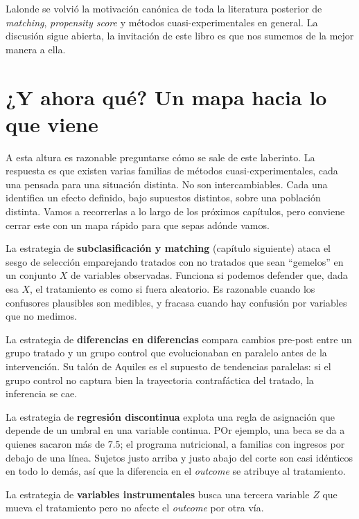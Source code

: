 \documentclass[
  letterpaper,
  DIV=11,
  numbers=noendperiod,
  oneside]{scrreprt}
\begin{document}
Lalonde se volvió la motivación canónica de toda la literatura posterior
de \emph{matching}, \emph{propensity score} y métodos
cuasi-experimentales en general. La discusión sigue abierta, la
invitación de este libro es que nos sumemos de la mejor manera a ella.

\hypertarget{y-ahora-quuxe9-un-mapa-hacia-lo-que-viene}{%
\section{¿Y ahora qué? Un mapa hacia lo que
viene}\label{y-ahora-quuxe9-un-mapa-hacia-lo-que-viene}}

A esta altura es razonable preguntarse cómo se sale de este laberinto.
La respuesta es que existen varias familias de métodos
cuasi-experimentales, cada una pensada para una situación distinta. No
son intercambiables. Cada una identifica un efecto definido, bajo
supuestos distintos, sobre una población distinta. Vamos a recorrerlas a
lo largo de los próximos capítulos, pero conviene cerrar este con un
mapa rápido para que sepas adónde vamos.

La estrategia de \textbf{subclasificación y matching} (capítulo
siguiente) ataca el sesgo de selección emparejando tratados con no
tratados que sean ``gemelos'' en un conjunto \(X\) de variables
observadas. Funciona si podemos defender que, dada esa \(X\), el
tratamiento es como si fuera aleatorio. Es razonable cuando los
confusores plausibles son medibles, y fracasa cuando hay confusión por
variables que no medimos.

La estrategia de \textbf{diferencias en diferencias} compara cambios
pre-post entre un grupo tratado y un grupo control que evolucionaban en
paralelo antes de la intervención. Su talón de Aquiles es el supuesto de
tendencias paralelas: si el grupo control no captura bien la trayectoria
contrafáctica del tratado, la inferencia se cae.

La estrategia de \textbf{regresión discontinua} explota una regla de
asignación que depende de un umbral en una variable continua. POr
ejemplo, una beca se da a quienes sacaron más de 7.5; el programa
nutricional, a familias con ingresos por debajo de una línea. Sujetos
justo arriba y justo abajo del corte son casi idénticos en todo lo
demás, así que la diferencia en el \emph{outcome} se atribuye al
tratamiento.

La estrategia de \textbf{variables instrumentales} busca una tercera
variable \(Z\) que mueva el tratamiento pero no afecte el \emph{outcome}
por otra vía.
\end{document}
